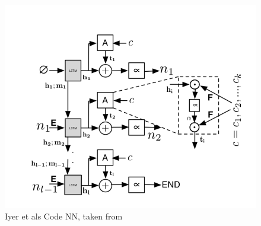 \begin{figure}[tb]
    \centering
    \includegraphics[width=0.5\linewidth]{ModelPics/Iyer_etal.png}
    \caption{Iyer et als Code NN, taken from \cite{iyer_summarizing_2016}}
    \label{fig:Iyer}
\end{figure}



